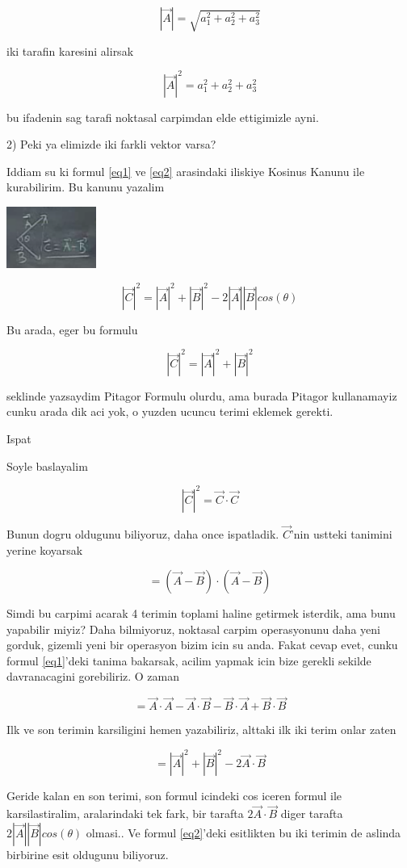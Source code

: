 \documentclass[12pt,fleqn]{article}
\begin{document}
\[ |\vec{A}| = \sqrt{a_1 ^2 + a_2^2 + a_3^2} \]

iki tarafin karesini alirsak

\[ |\vec{A}|^2 = a_1 ^2 + a_2^2 + a_3^2\]

bu ifadenin sag tarafi noktasal carpimdan elde ettigimizle ayni. 

2) Peki ya elimizde iki farkli vektor varsa? 

Iddiam su ki formul \ref{eq1} ve \ref{eq2} arasindaki iliskiye Kosinus
Kanunu ile kurabilirim. Bu kanunu yazalim

\includegraphics[height=2cm]{1_11.png}

\[ |\vec{C}|^2 = |\vec{A}|^2 + |\vec{B}|^2 - 2|\vec{A}||\vec{B}|cos(\theta) \]

Bu arada, eger bu formulu 

\[ |\vec{C}|^2 = |\vec{A}|^2 + |\vec{B}|^2  \]

seklinde yazsaydim Pitagor Formulu olurdu, ama burada Pitagor kullanamayiz
cunku arada dik aci yok, o yuzden ucuncu terimi eklemek gerekti. 

Ispat

Soyle baslayalim

\[ |\vec{C}|^2 = \vec{C} \cdot \vec{C} \]

Bunun dogru oldugunu biliyoruz, daha once ispatladik. $\vec{C}$'nin
ustteki tanimini yerine koyarsak

\[ = (\vec{A} - \vec{B}) \cdot (\vec{A} - \vec{B})  \]

Simdi bu carpimi acarak 4 terimin toplami haline getirmek isterdik, ama
bunu yapabilir miyiz? Daha bilmiyoruz, noktasal carpim operasyonunu daha
yeni gorduk, gizemli yeni bir operasyon bizim icin su anda. Fakat cevap
evet, cunku formul \ref{eq1}'deki tanima bakarsak, acilim yapmak icin bize
gerekli sekilde davranacagini gorebiliriz. O zaman

\[  =
\vec{A}\cdot\vec{A} - 
\vec{A}\cdot\vec{B} -
\vec{B}\cdot\vec{A} +
\vec{B}\cdot\vec{B} 
\]

Ilk ve son terimin karsiligini hemen yazabiliriz, alttaki ilk iki terim
onlar zaten

\[ = |\vec{A}|^2 + |\vec{B}|^2 - 2\vec{A} \cdot \vec{B} \]

Geride kalan en son terimi, son formul icindeki cos iceren formul ile
karsilastiralim, aralarindaki tek fark, bir tarafta $2\vec{A} \cdot
\vec{B}$ diger 
tarafta $2|\vec{A}||\vec{B}|cos(\theta)$ olmasi.. Ve formul \ref{eq2}'deki 
esitlikten  bu iki terimin de aslinda birbirine esit oldugunu
biliyoruz. 
\end{document}
